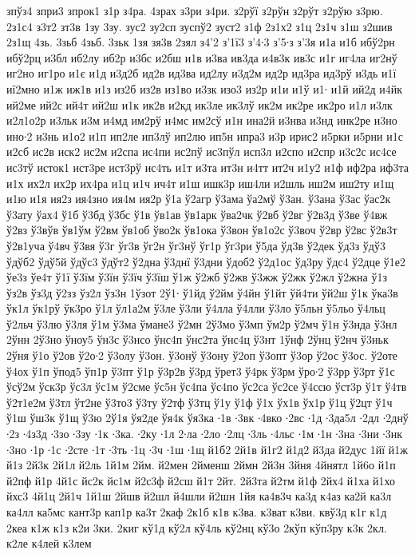 {зпўз4
зпри3
зпрок1
з1р
з4ра.
4зрах
з3ри
з4ри.
з2рўї
з2рўн
з2рўт
з2рўю
з3рю.
2з1с4
з3т2
зт3в
1зу
3зу.
зус2
зу2сп
зуспў2
зуст2
з1ф
2з1х2
з1ц
2з1ч
з1ш
з2шив
2з1щ
4зь.
3зьб
4зьб.
3зьк
1зя
зя3в
2зял
з4'2
з'1ї3
з'4∙3
з'5∙з
з'3я
и1а
и1б
ибў2рн
ибў2рц
и3бл
иб2лу
иб2р
и3бс
и2бш
и1в
и3ва
ив3да
и4в3к
ив3с
и1г
иг4ла
иг2нў
иг2но
иг1ро
и1є
и1д
и3д2б
ид2в
ид3ва
ид2лу
и3д2м
ид2р
ид3ра
ид3рў
и3дь
и1ї
иї2мно
и1ж
иж1в
и1з
из2б
из2в
из1во
и3зк
изо3
из2р
и1и
и1ў
и1∙
и1й
ий2д
и4йк
ий2ме
ий2с
ий4т
ий2ш
и1к
ик2в
и2кд
ик3ле
ик3лў
ик2м
ик2ре
ик2ро
и1л
и3лк
и2л1о2р
и3льк
и3м
и4мд
им2рў
и4мс
им2сў
и1н
ина2й
и3нва
и3нд
инк2ре
и3но
ино∙2
и3нь
и1о2
и1п
ип2ле
ип3лў
ип2лю
ип5н
ипра3
и3р
ирис2
и5рки
и5рни
и1с
и2сб
ис2в
иск2
ис2м
и2спа
ис4пи
ис2пў
ис3пўл
исп3л
и2спо
и2спр
и3с2с
ис4се
ис3тў
исток1
ист3ре
ист3рў
ис4ть
и1т
и3та
ит3н
и4тт
ит2ч
и1у2
и1ф
иф2ра
иф3та
и1х
их2л
их2р
их4ра
и1ц
и1ч
ич4т
и1ш
ишк3р
иш4ли
и2шль
иш2м
иш2ту
и1щ
и1ю
и1я
ия2з
ия4зно
ия4м
ия2р
ў1а
ў2агр
ў3ама
ўа2мў
ў3ан.
ў3ана
ў3ас
ўас2к
ў3ату
ўах4
ў1б
ў3бд
ў3бс
ў1в
ўв1ав
ўв1арк
ўва2чк
ў2вб
ў2вг
ў2в3д
ў3ве
ў4вж
ў2вз
ў3вўв
ўв1ўм
ў2вм
ўв1об
ўво2к
ўв1ока
ў3вон
ўв1о2с
ў3воч
ў2вр
ў2вс
ў2в3т
ў2в1уча
ў4вч
ў3вя
ў3г
ўг3в
ўг2н
ўг3нў
ўг1р
ўг3ри
ў5да
ўд3в
ў2дек
ўд3з
ўдў3
ўдўб2
ўдў5й
ўдўс3
ўдўт2
ў2дна
ў3днї
ў3дни
ўдоб2
ў2д1ос
ўд3ру
ўдс4
ў2дце
ў1е2
ўе3з
ўе4т
ў1ї
ў3їм
ў3їн
ў3їч
ў3їш
ў1ж
ў2жб
ў2жв
ў3жж
ў2жк
ў2жл
ў2жна
ў1з
ўз2в
ўз3д
ў2зз
ўз2л
ўз3н
1ўзот
2ў1∙
ў1йд
ў2йм
ў4йн
ў1йт
ўй4ти
ўй2ш
ў1к
ўка3в
ўк1л
ўк1рў
ўк3ро
ў1л
ўл1а2м
ў3ле
ў3ли
ў4лла
ў4лли
ў3ло
ў5льн
ў5льо
ў4льц
ў2льч
ў3лю
ў3ля
ў1м
ў3ма
ўмане3
ў2мн
2ў3мо
ў3мп
ўм2р
ў2мч
ў1н
ў3нда
ў3нл
2ўнн
2ў3но
ўноу5
ўн3с
ў3нсо
ўнс4п
ўнс2та
ўнс4ц
ў3нт
1ўнф
2ўнц
ў2нч
ў3ньк
2ўня
ў1о
ў2ов
ў2о∙2
ў3олу
ў3он.
ў3онў
ў3ону
ў2оп
ў3опт
ў3ор
ў2ос
ў3ос.
ў2оте
ў4ох
ў1п
ўпод5
ўп1р
ў3пт
ў1р
ў3р2в
ў3рд
ўрет3
ў4рк
ў3рм
ўро∙2
ў3рр
ў3рт
ў1с
ўсў2м
ўск3р
ўс3л
ўс1м
ў2сме
ўс5н
ўс4па
ўс4по
ўс2са
ўс2се
ў4ссю
ўст3р
ў1т
ў4тв
ў2т1е2м
ў3тл
ўт2не
ў3то3
ў3ту
ў2тф
ў3тц
ў1у
ў1ф
ў1х
ўх1в
ўх1р
ў1ц
ў2цт
ў1ч
ў1ш
ўш3к
ў1щ
ў3ю
2ў1я
ўя2де
ўя4к
ўя3ка
∙1в
∙3вк
∙4вко
∙2вс
∙1д
∙3да5л
∙2дл
∙2днў
∙2з
∙4з3д
∙3зо
∙3зу
∙1к
∙3ка.
∙2ку
∙1л
2∙ла
∙2ло
∙2лц
∙3ль
∙4льс
∙1м
∙1н
∙3на
∙3ни
∙3нк
∙3но
∙1р
∙1с
∙2сте
∙1т
∙3ть
∙1ц
∙3ч
∙1ш
∙1щ
й1б2
2й1в
й1г2
й1д2
й3да
й2дус
1йї
й1ж
й1з
2й3к
2й1л
й2ль
1й1м
2йм.
й2мен
2йменш
2ймн
2й3н
3йня
4йнятл
1й6о
й1п
й2пф
й1р
4й1с
йс2к
йс1м
й2с3ф
й2сш
й1т
2йт.
2й3та
й2тм
й1ф
2йх4
й1ха
й1хо
йхс3
4й1ц
2й1ч
1й1ш
2йшв
й2шл
й4шли
й2шн
1йя
ка4в3ч
ка3д
к4аз
ка2й
ка3л
ка4лл
ка5мс
кант3р
кап1р
ка3т
2каф
2к1б
к1в
к3ва.
к3ват
к3ви.
квў3д
к1г
к1д
2кеа
к1ж
к1з
к2и
3ки.
2киг
кў1д
кў2л
кў4ль
кў2нц
кў3о
2кўп
кўп3ру
к3к
2кл.
к2ле
к4лей
к3лем
}
